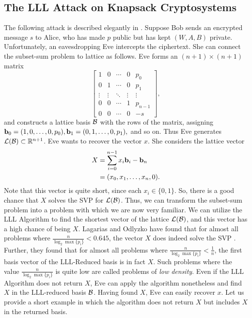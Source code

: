 \documentclass[a4paper,12pt]{article}
\begin{document}
\subsection{The LLL Attack on Knapsack Cryptosystems}
The following attack is described elegantly in \cite{LaO}. Suppose Bob sends an encrypted message $s$ to Alice, who has made $p$ public but has kept $(W,A,B)$ private. Unfortunately, an eavesdropping Eve intercepts the ciphertext. She can connect the subset-sum problem to lattice as follows. Eve forms an $(n+1) \times (n+1)$ matrix $$
\begin{bmatrix}
    1& 0& \cdots& 0& p_0\\
    0& 1& \cdots& 0& p_1\\
    \vdots& \vdots& \ddots& \vdots& \vdots\\
    0& 0& \cdots& 1& p_{n-1}\\
    0& 0& \cdots& 0& -s
\end{bmatrix},
$$and constructs a lattice basis $\mathcal{B}$ with the rows of the matrix, assigning $ 
\mathbf{b}_0 = (1, 0, \ldots, 0, p_0),
\mathbf{b}_1 = (0, 1, \ldots, 0, p_1),
$ and so on. Thus Eve generates $\mathcal{L}(\mathcal{B}) \subset \mathbb{R}^{n+1}$. Eve wants to recover the vector $x$. She considers the lattice vector 
\begin{align*}
    X &= \sum_{i=0}^{n-1}x_{i}\mathbf{b}_{i} - \mathbf{b}_{n} \\
    &= (x_0, x_1, \ldots, x_n, 0).
\end{align*} Note that this vector is quite short, since each $x_i \in \lbrace 0,1 \rbrace$. So, there is a good chance that $X$ solves the SVP for $\mathcal{L}(\mathcal{B})$. Thus, we can transform the subset-sum problem into a problem with which we are now very familiar. We can utilize the LLL Algorithm to find the shortest vector of the lattice $\mathcal{L}(\mathcal{B})$, and this vector has a high chance of being $X$. Lagarias and Odlyzko have found that for almost all problems where $\frac{n}{\log_{2}\max\lbrace p_i\rbrace} < 0.645$, the vector $X$ does indeed solve the SVP \cite{LaO}. Further, they found that for almost all problems where $\frac{n}{\log_{2}\max\lbrace p_i\rbrace} < \frac{1}{n}$, the first basis vector of the LLL-Reduced basis is in fact $X$. Such problems where the value $\frac{n}{\log_{2}\max\lbrace p_i\rbrace}$ is quite low are called problems of \textit{low density}. Even if the LLL Algorithm does not return $X$, Eve can apply the algorithm nonetheless and find $X$ in the LLL-reduced basis $\mathcal{B}$. Having found $X$, Eve can easily recover $x$. Let us provide a short example in which the algorithm does not return $X$ but includes $X$ in the returned basis.
\end{document}
